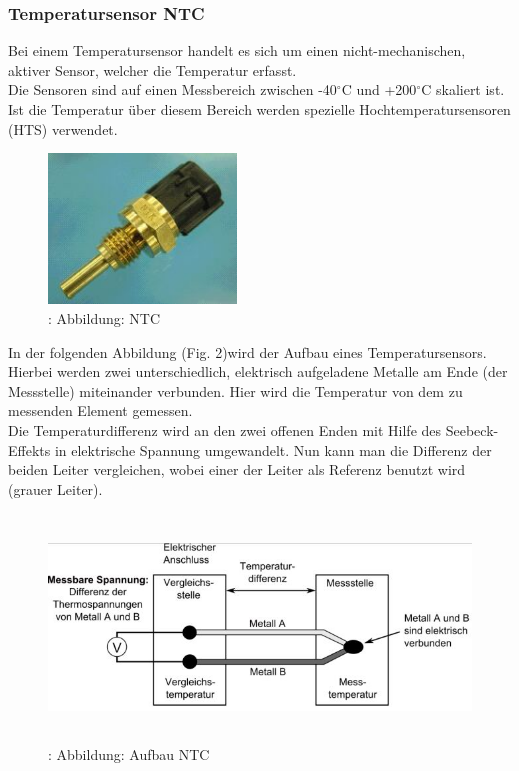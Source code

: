 	\subsubsection{Temperatursensor NTC}
	\begin{flushleft}
		Bei einem Temperatursensor handelt es sich um einen nicht-mechanischen, aktiver	Sensor, welcher die Temperatur erfasst.\\
		Die Sensoren sind auf einen Messbereich zwischen -40$^\circ$C und +200$^\circ$C skaliert ist. Ist die Temperatur über diesem Bereich werden spezielle Hochtemperatursensoren (HTS) verwendet.
	\end{flushleft}
	
	\begin{figure}
		\centering
		\includegraphics[width=5cm, height=4cm] {ntc.png}
		\caption{\cite{TS_temp_pic}: Abbildung: NTC}
	\end{figure}
	
	\begin{flushleft}
		In der folgenden Abbildung (Fig. 2)wird der Aufbau eines Temperatursensors. Hierbei werden zwei unterschiedlich, elektrisch aufgeladene Metalle am Ende (der Messstelle) miteinander verbunden. Hier wird die Temperatur von dem zu messenden Element gemessen.\\
		Die Temperaturdifferenz wird an den zwei offenen Enden mit Hilfe des Seebeck-Effekts in elektrische Spannung umgewandelt. Nun kann man die Differenz der beiden Leiter vergleichen, wobei einer der Leiter als Referenz benutzt wird (grauer Leiter).\cite{TS_temp} 
		
	\end{flushleft}
	
	\begin{figure}
		\centering
		\includegraphics[width=12cm, height=6cm] {aufbau_ntc.png}
		\caption{\cite{TS_see_beck}: Abbildung: Aufbau NTC}
	\end{figure}
	
